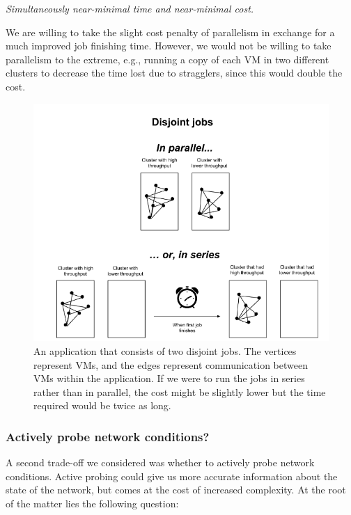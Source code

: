\documentclass[11pt]{article}
\begin{document}
\textit{Simultaneously near-minimal time and near-minimal cost.}

We are willing to take the slight cost penalty of parallelism in exchange for a much improved job finishing time.  However, we would not be willing to take parallelism to the extreme, e.g., running a copy of each VM in two different clusters to decrease the time lost due to stragglers, since this would double the cost.

\begin{figure}[h!]
  \centering
\includegraphics[scale=0.65]{disjointjobs.png}

 \caption{ An application that consists of two disjoint jobs.  The vertices represent VMs, and the edges represent communication between VMs within the application.  If we were to run the jobs in series rather than in parallel, the cost might be slightly lower but the time required would be twice as long.}

\end{figure}


\subsubsection{Actively probe network conditions?}

A second trade-off we considered was whether to actively probe network conditions.  Active probing could give us more accurate information about the state of the network, but comes at the cost of increased complexity.  At the root of the matter lies the following question:
\end{document}
